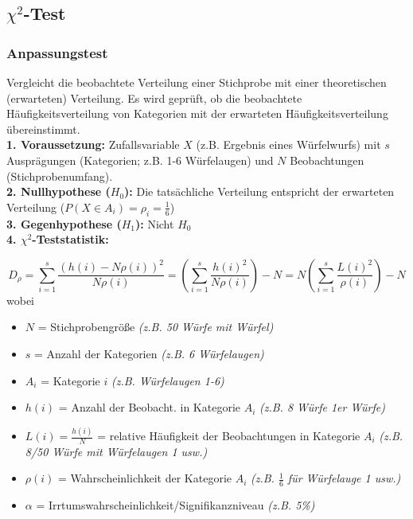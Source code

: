 \subsection{\(\chi^2\)-Test}

\subsubsection{Anpassungstest}

Vergleicht die beobachtete Verteilung einer Stichprobe mit 
einer theoretischen (erwarteten) Verteilung. Es wird geprüft, 
ob die beobachtete Häufigkeitsverteilung von Kategorien mit der 
erwarteten Häufigkeitsverteilung übereinstimmt.\\

\textbf{1. Voraussetzung:} Zufallsvariable \(X\) (z.B. Ergebnis eines Würfelwurfs) mit \(s\) Ausprägungen 
(Kategorien; z.B. 1-6 Würfelaugen) und \(N\) Beobachtungen (Stichprobenumfang).\\

\textbf{2. Nullhypothese (\(H_0\)):} Die tatsächliche Verteilung entspricht der erwarteten Verteilung (\(P(X \in A_i)=\rho_i=\frac{1}{6}\))\\

\textbf{3. Gegenhypothese (\(H_1\)):} Nicht \(H_0\)\\

\textbf{4. \(\chi^2\)-Teststatistik:}

\begin{equation*}
    D_{\rho} = \sum_{i=1}^{s}\frac{(h(i)-N\rho(i))^2}{N\rho(i)}=\left(\sum_{i=1}^{s}\frac{h(i)^2}{N\rho(i)}\right)-N=N\left(\sum_{i=1}^{s}\frac{L(i)^2}{\rho(i)}\right) - N
\end{equation*}
wobei
\begin{itemize}
    \item \(N\) = Stichprobengröße \emph{(z.B. 50 Würfe mit Würfel)}
    \item \(s\) = Anzahl der Kategorien \emph{(z.B. 6 Würfelaugen)}
    \item \(A_i\) = Kategorie \(i\) \emph{(z.B. Würfelaugen 1-6)}
    \item \(h(i)\) = Anzahl der Beobacht. in Kategorie \(A_i\) \emph{(z.B. 8 Würfe 1er Würfe)}
    \item \(L(i)=\frac{h(i)}{N}\) = relative Häufigkeit der Beobachtungen in Kategorie \(A_i\) \emph{(z.B. 8/50 Würfe mit Würfelaugen 1 usw.)}
    \item \(\rho(i)\) = Wahrscheinlichkeit der Kategorie \(A_i\) \emph{(z.B. \(\frac{1}{6}\) für Würfelauge 1 usw.)}
    \item \(\alpha\) = Irrtumswahrscheinlichkeit/Signifikanzniveau \emph{(z.B. 5\%)}
\end{itemize}


